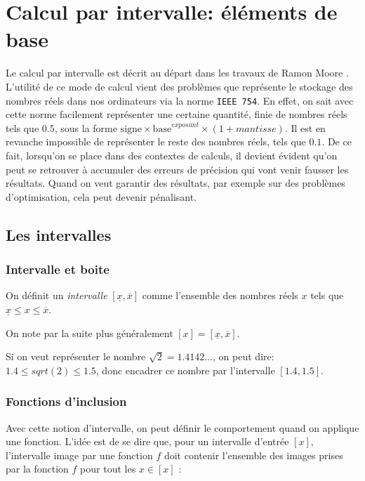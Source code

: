 \chapter{Calcul par intervalle: éléments de base}

Le calcul par intervalle est décrit au départ dans les travaux de Ramon Moore \cite{Moore66}. L'utilité de ce mode de calcul vient des problèmes que représente le stockage des nombres réels dans nos ordinateurs via la norme \texttt{IEEE 754}. En effet, on sait avec cette norme facilement représenter une certaine quantité, finie de nombres réels tels que $0.5$, sous la forme $\text{signe} \times \text{base}^{exposant} \times (1 + mantisse)$. Il est en revanche impossible de représenter le reste des nombres réels, tels que $0.1$. De ce fait, lorsqu'on se place dans des contextes de calculs, il devient évident qu'on peut se retrouver à accumuler des erreurs de précision qui vont venir fausser les résultats. Quand on veut garantir des résultats, par exemple sur des problèmes d'optimisation, cela peut devenir pénalisant.

\section{Les intervalles}
\subsection{Intervalle et boite}

\begin{definition}
  On définit un \textit{intervalle} $[\underline{x}, \overline{x}]$ comme l'ensemble des nombres réels $x$ tels que $\underline{x} \leq x \leq \overline{x}$.
\end{definition}

On note par la suite plus généralement $[x] = [\underline{x}, \overline{x}]$.

\begin{ex}
  Si on veut représenter le nombre $\sqrt{2} = 1.4142\dots$, on peut dire: $1.4 \leq sqrt(2) \leq 1.5$, donc encadrer ce nombre par l'intervalle $[1.4, 1.5]$.
\end{ex}

\subsection{Fonctions d'inclusion}
Avec cette notion d'intervalle, on peut définir le comportement quand on applique une fonction. L'idée est de se dire que, pour un intervalle d'entrée $[x]$, l'intervalle image par une fonction $f$ doit contenir l'ensemble des images prises par la fonction $f$ pour tout les $x \in [x]$ :

